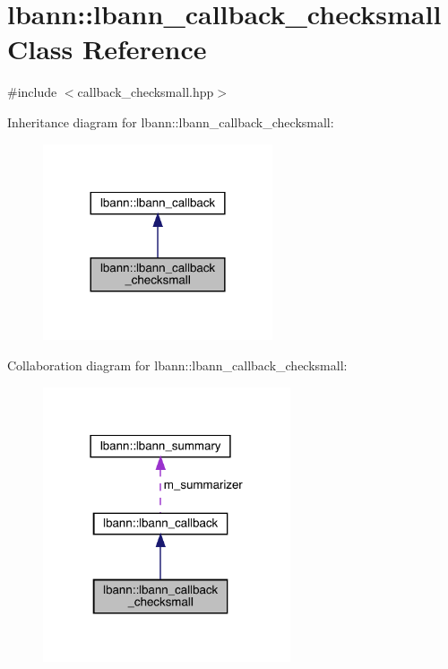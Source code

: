 \hypertarget{classlbann_1_1lbann__callback__checksmall}{}\section{lbann\+:\+:lbann\+\_\+callback\+\_\+checksmall Class Reference}
\label{classlbann_1_1lbann__callback__checksmall}


{\ttfamily \#include $<$callback\+\_\+checksmall.\+hpp$>$}



Inheritance diagram for lbann\+:\+:lbann\+\_\+callback\+\_\+checksmall\+:\nopagebreak
\begin{figure}[H]
\begin{center}
\leavevmode
\includegraphics[width=192pt]{classlbann_1_1lbann__callback__checksmall__inherit__graph}
\end{center}
\end{figure}


Collaboration diagram for lbann\+:\+:lbann\+\_\+callback\+\_\+checksmall\+:\nopagebreak
\begin{figure}[H]
\begin{center}
\leavevmode
\includegraphics[width=207pt]{classlbann_1_1lbann__callback__checksmall__coll__graph}
\end{center}
\end{figure}
